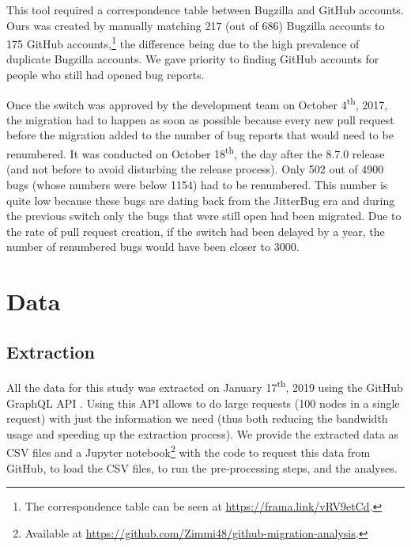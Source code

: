 \documentclass[conference]{IEEEtran}
\begin{document}
This tool required a correspondence table between Bugzilla and GitHub accounts. Ours was created by manually matching 217 (out of 686) Bugzilla accounts to 175 GitHub accounts,\footnote{The correspondence table can be seen at \url{https://frama.link/vRV9etCd}.} the difference being due to the high prevalence of duplicate Bugzilla accounts. We gave priority to finding GitHub accounts for people who still had opened bug reports.

Once the switch was approved by the development team on October 4\textsuperscript{th}, 2017, the migration had to happen as soon as possible because every new pull request before the migration added to the number of bug reports that would need to be renumbered. It was conducted %
on October 18\textsuperscript{th},  the day after the 8.7.0 release (and not before to avoid disturbing the release process). Only 502 out of 4900 bugs (whose numbers were below 1154) had to be renumbered. This number is quite low because these bugs are dating back from the JitterBug era and during the previous switch only the bugs that were still open had been migrated.
Due to the rate of pull request creation, if the switch had been delayed by a year, the number of renumbered bugs would have been closer to 3000.

\section{Data}
\label{data}

\subsection{Extraction}

All the data for this study was extracted on January 17\textsuperscript{th}, 2019 using the GitHub GraphQL API \cite{github_graphql_API}. Using this API allows to do large requests (100 nodes in a single request) with just the information we need (thus both reducing the bandwidth usage and speeding up the extraction process). We provide the extracted data as CSV files and a Jupyter notebook\footnote{Available at \url{https://github.com/Zimmi48/github-migration-analysis}.} with the code to request this data from GitHub, to load the CSV files, to run the pre-processing steps, and the analyses.%
\end{document}
